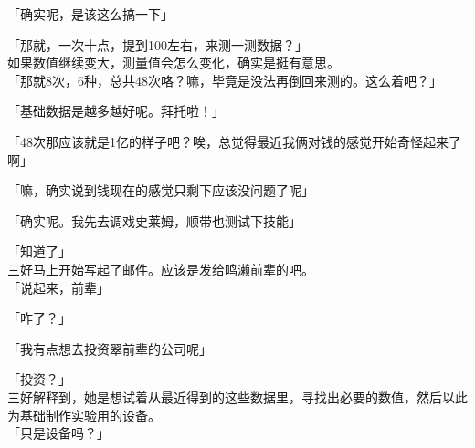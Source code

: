 「确实呢，是该这么搞一下」

「那就，一次十点，提到100左右，来测一测数据？」\\

如果数值继续变大，测量值会怎么变化，确实是挺有意思。\\

「那就8次，6种，总共48次咯？嘛，毕竟是没法再倒回来测的。这么着吧？」

「基础数据是越多越好呢。拜托啦！」

「48次那应该就是1亿的样子吧？唉，总觉得最近我俩对钱的感觉开始奇怪起来了啊」

「嘛，确实说到钱现在的感觉只剩下应该没问题了呢」

「确实呢。我先去调戏史莱姆，顺带也测试下技能」

「知道了」\\

三好马上开始写起了邮件。应该是发给鸣濑前辈的吧。\\

「说起来，前辈」

「咋了？」

「我有点想去投资翠前辈的公司呢」

「投资？」\\

三好解释到，她是想试着从最近得到的这些数据里，寻找出必要的数值，然后以此为基础制作实验用的设备。\\

「只是设备吗？」

